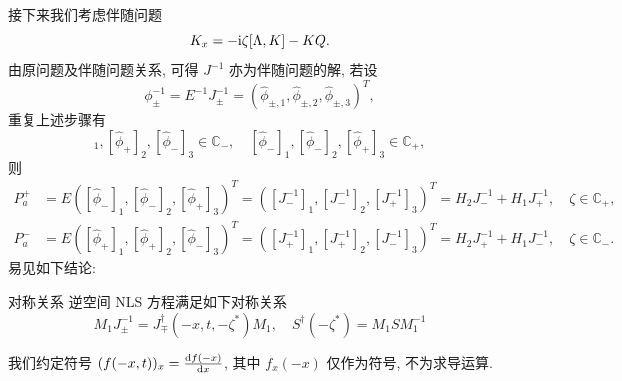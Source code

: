 接下来我们考虑伴随问题
\begin{equation}
    K_{x} = -\mathrm{i} \zeta [\Lambda, K] - K Q.
    \label{ch4-eq-reverse-x-Lax-adjoint}
\end{equation}
由原问题及伴随问题关系, 可得 $J^{-1}$ 亦为伴随问题的解, 若设
\begin{equation}
    \phi_{\pm}^{-1} = E^{-1} J_{\pm}^{-1} = (\hat{\phi}_{\pm,1}, \hat{\phi}_{\pm,2}, \hat{\phi}_{\pm,3})^{T},
\end{equation}
重复上述步骤有
\begin{equation}
    [\hat{\phi}_{+}]_{1}, [\hat{\phi}_{+}]_{2}, [\hat{\phi}_{-}]_{3} \in \mathbb{C}_{-}, \quad [\hat{\phi}_{-}]_{1}, [\hat{\phi}_{-}]_{2}, [\hat{\phi}_{+}]_{3} \in \mathbb{C}_{+},
\end{equation}
则
\begin{align}
    P_{a}^{+} & = E ([\hat{\phi}_{-}]_{1}, [\hat{\phi}_{-}]_{2}, [\hat{\phi}_{+}]_{3})^{T} = \left([J_{-}^{-1}]_{1}, [J_{-}^{-1}]_{2}, [J_{+}^{-1}]_{3}\right)^{T} = H_{2} J_{-}^{-1} + H_{1} J_{+}^{-1}, \quad \zeta \in \mathbb{C}_{+}, \\
    P_{a}^{-} & = E ([\hat{\phi}_{+}]_{1}, [\hat{\phi}_{+}]_{2}, [\hat{\phi}_{-}]_{3})^{T} = \left([J_{+}^{-1}]_{1}, [J_{+}^{-1}]_{2}, [J_{-}^{-1}]_{3}\right)^{T} = H_{2} J_{+}^{-1} + H_{1} J_{-}^{-1}, \quad \zeta \in \mathbb{C}_{-}.
\end{align}
易见如下结论:
\begin{proposition}{对称关系}
    逆空间 NLS 方程满足如下对称关系
    \begin{equation}
        M_{1} J_{\pm}^{-1} = J_{\mp}^{\dagger}(-x,t, -\zeta^{*}) M_{1}, \quad S^{\dagger}(-\zeta^{*}) = M_{1} S M_{1}^{-1}
        \label{ch4-eq-reverse-x-symmetry}
    \end{equation}
\end{proposition}
我们约定符号 $(f(-x,t))_{x} = \frac{\mathop{}\!\mathrm{d} f(-x)}{\mathop{}\!\mathrm{d} x}$, 其中 $f_{x}(-x)$ 仅作为符号, 不为求导运算.
